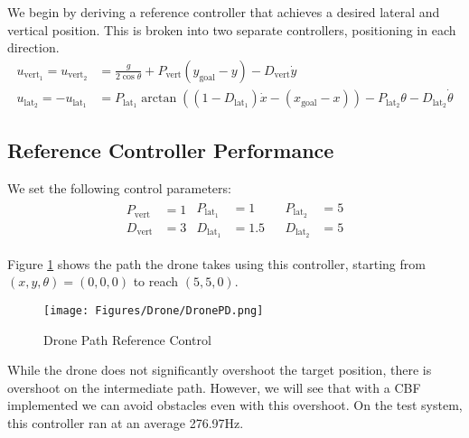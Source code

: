 \noindent We begin by deriving a reference controller that achieves a desired lateral and vertical position. This is broken into two separate controllers, positioning in each direction. 
\begin{align}
    u_{\text{vert}_1} = u_{\text{vert}_2} &= \frac{g}{2 \cos{\theta}} + P_{\text{vert}} \left (y_{\text{goal}} -  y\right) - D_{\text{vert}}\dot{y} \\
    u_{\text{lat}_2} = -u_{\text{lat}_1} &= P_{\text{lat}_1}\arctan{\left ((1 - D_{\text{lat}_1})\dot{x} - (x_{\text{goal}} - x) \right )} -  P_{\text{lat}_2}\theta - D_{\text{lat}_2}\dot{\theta}
\end{align}
\subsection{Reference Controller Performance}

\noindent We set the following control parameters:
\begin{align*}
\begin{split}
    P_{\text{vert}} &= 1 \\
    D_{\text{vert}} &= 3
\end{split}
\begin{split}
    P_{\text{lat}_1} &= 1 \\
    D_{\text{lat}_1} &= 1.5
\end{split}
\begin{split}
\end{split}
\begin{split}
    P_{\text{lat}_2} &= 5 \\
    D_{\text{lat}_2} &= 5
\end{split}
\end{align*}

\noindent Figure \ref{fig:dronepd} shows the path the drone takes using this controller, starting from $(x, y, \theta) = (0, 0, 0)$ to reach $(5, 5, 0)$.

\begin{figure}[H]
    \centering
    \texttt{[image: Figures/Drone/DronePD.png]}
    \caption{Drone Path Reference Control}
    \label{fig:dronepd}
\end{figure}

\noindent While the drone does not significantly overshoot the target position, there is overshoot on the intermediate path. However, we will see that with a CBF implemented we can avoid obstacles even with this overshoot. On the test system, this controller ran at an average 276.97Hz.

